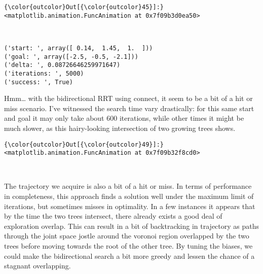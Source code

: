 \documentclass{article}
\begin{document}
            \begin{Verbatim}[commandchars=\\\{\}]
{\color{outcolor}Out[{\color{outcolor}45}]:} <matplotlib.animation.FuncAnimation at 0x7f09b3d0ea50>
\end{Verbatim}
        
    \begin{center}
    \end{center}
    { \hspace*{\fill} \\}
    

    \begin{Verbatim}[commandchars=\\\{\}]
('start: ', array([ 0.14,  1.45,  1.  ]))
('goal: ', array([-2.5, -0.5, -2.1]))
('delta: ', 0.08726646259971647)
('iterations: ', 5000)
('success: ', True)
    \end{Verbatim}

    Hmm\ldots{} with the bidirectional RRT using connect, it seem to be a
bit of a hit or miss scenario. I've witnessed the search time vary
drastically: for this same start and goal it may only take about 600
iterations, while other times it might be much slower, as this
hairy-looking intersection of two growing trees shows.




            \begin{Verbatim}[commandchars=\\\{\}]
{\color{outcolor}Out[{\color{outcolor}49}]:} <matplotlib.animation.FuncAnimation at 0x7f09b32f8cd0>
\end{Verbatim}
        
    \begin{center}
    \end{center}
    { \hspace*{\fill} \\}
    
    The trajectory we acquire is also a bit of a hit or miss. In terms of
performance in completeness, this approach finds a solution well under
the maximum limit of iterations, but sometimes misses in optimality. In
a few instances it appears that by the time the two trees intersect,
there already exists a good deal of exploration overlap. This can result
in a bit of backtracking in trajectory as paths through the joint space
jostle around the voronoi region overlapped by the two trees before
moving towards the root of the other tree. By tuning the biases, we
could make the bidirectional search a bit more greedy and lessen the
chance of a stagnant overlapping.
\end{document}
